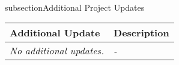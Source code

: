 \\subsection{Additional Project Updates}

\begin{table}[!h]
    \centering
    \begin{tabularx}{\textwidth}{|l|X|}
        \hline
        Additional Update & Description \\
        \hline
        \hline
        \textit{No additional updates.} & 
        \textit{-}\\
        \hline
    \end{tabularx}
\end{table}
